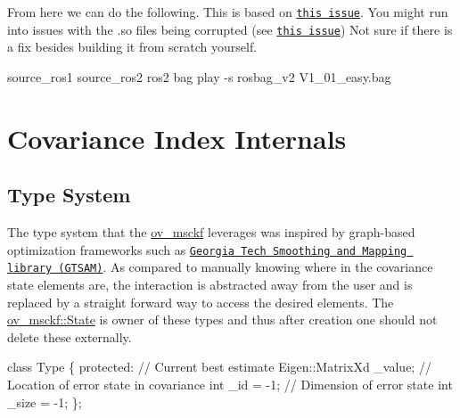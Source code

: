 From here we can do the following. This is based on \href{https://github.com/ros2/rosbag2/issues/139#issuecomment-516167831}{\tt this issue}. You might run into issues with the .so files being corrupted (see \href{https://github.com/ros2/rosbag2/issues/94}{\tt this issue}) Not sure if there is a fix besides building it from scratch yourself.


\begin{DoxyCode}
source\_ros1
source\_ros2
ros2 bag play -s rosbag\_v2 V1\_01\_easy.bag
\end{DoxyCode}
 \hypertarget{dev-index}{}\section{Covariance Index Internals}\label{dev-index}
\hypertarget{dev-index_dev-index-types}{}\subsection{Type System}\label{dev-index_dev-index-types}
The type system that the \hyperlink{namespaceov__msckf}{ov\+\_\+msckf} leverages was inspired by graph-\/based optimization frameworks such as \href{https://github.com/borglab/gtsam}{\tt Georgia Tech Smoothing and Mapping library (G\+T\+S\+AM)}. As compared to manually knowing where in the covariance state elements are, the interaction is abstracted away from the user and is replaced by a straight forward way to access the desired elements. The \hyperlink{classov__msckf_1_1State}{ov\+\_\+msckf\+::\+State} is owner of these types and thus after creation one should not delete these externally.


\begin{DoxyCode}
\textcolor{keyword}{class }Type \{
\textcolor{keyword}{protected}:
    \textcolor{comment}{// Current best estimate}
    Eigen::MatrixXd \_value;
    \textcolor{comment}{// Location of error state in covariance}
    \textcolor{keywordtype}{int} \_id = -1;
    \textcolor{comment}{// Dimension of error state}
    \textcolor{keywordtype}{int} \_size = -1;
\};
\end{DoxyCode}


